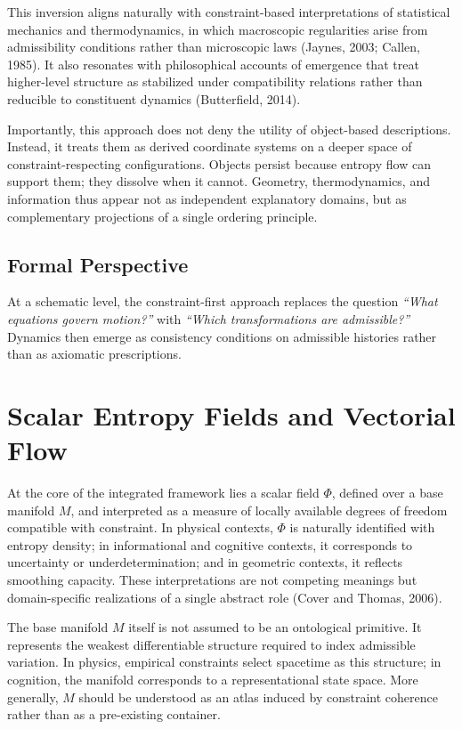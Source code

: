 \documentclass[11pt]{article}
\begin{document}
This inversion aligns naturally with constraint-based interpretations of statistical mechanics and thermodynamics, in which macroscopic regularities arise from admissibility conditions rather than microscopic laws (Jaynes, 2003; Callen, 1985). It also resonates with philosophical accounts of emergence that treat higher-level structure as stabilized under compatibility relations rather than reducible to constituent dynamics (Butterfield, 2014).

Importantly, this approach does not deny the utility of object-based descriptions. Instead, it treats them as derived coordinate systems on a deeper space of constraint-respecting configurations. Objects persist because entropy flow can support them; they dissolve when it cannot. Geometry, thermodynamics, and information thus appear not as independent explanatory domains, but as complementary projections of a single ordering principle.

\subsection*{Formal Perspective}

At a schematic level, the constraint-first approach replaces the question
\emph{``What equations govern motion?''}
with
\emph{``Which transformations are admissible?''}
Dynamics then emerge as consistency conditions on admissible histories rather than as axiomatic prescriptions.

\section{Scalar Entropy Fields and Vectorial Flow}

At the core of the integrated framework lies a scalar field $\Phi$, defined over a base manifold $M$, and interpreted as a measure of locally available degrees of freedom compatible with constraint. In physical contexts, $\Phi$ is naturally identified with entropy density; in informational and cognitive contexts, it corresponds to uncertainty or underdetermination; and in geometric contexts, it reflects smoothing capacity. These interpretations are not competing meanings but domain-specific realizations of a single abstract role (Cover and Thomas, 2006).

The base manifold $M$ itself is not assumed to be an ontological primitive. It represents the weakest differentiable structure required to index admissible variation. In physics, empirical constraints select spacetime as this structure; in cognition, the manifold corresponds to a representational state space. More generally, $M$ should be understood as an atlas induced by constraint coherence rather than as a pre-existing container.
\end{document}
